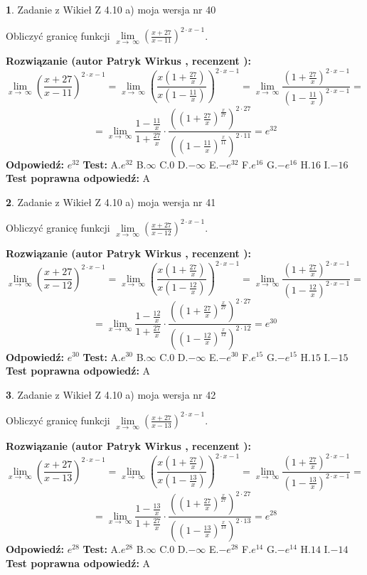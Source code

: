 \documentclass[12pt, a4paper]{article}
\theoremstyle{definition} %
\newtheorem{zad}{}
\newcommand{\zadStart}[1]{\begin{zad}#1\newline}
\newcommand{\zadStop}{\end{zad}}
\newcommand{\rozwStart}[2]{\noindent \textbf{Rozwiązanie (autor #1 , recenzent #2): }\newline}
\newcommand{\rozwStop}{\newline}
\newcommand{\odpStart}{\noindent \textbf{Odpowiedź:}\newline}
\newcommand{\odpStop}{\newline}
\newcommand{\testStart}{\noindent \textbf{Test:}\newline}
\newcommand{\testStop}{\newline}
\newcommand{\kluczStart}{\noindent \textbf{Test poprawna odpowiedź:}\newline}
\newcommand{\kluczStop}{\newline}
\begin{document}
\zadStart{Zadanie z Wikieł Z 4.10 a) moja wersja nr 40}

Obliczyć granicę funkcji  $\lim\limits_{x\to\ \infty}(\frac{x+27}{x-11})^{2\cdot x-1}$.
\zadStop
\rozwStart{Patryk Wirkus}{}
$$\lim\limits_{x\to\ \infty}(\frac{x+27}{x-11})^{2\cdot x-1} = \lim\limits_{x\to\ \infty}(\frac{x(1+\frac{27}{x})}{x(1-\frac{11}{x})})^{2\cdot x-1}=\lim\limits_{x\to\ \infty}\frac{(1+\frac{27}{x})^{2\cdot x-1}}{(1-\frac{11}{x})^{2\cdot x-1}}=$$
$$=\lim\limits_{x\to\ \infty}\frac{1-\frac{11}{x}}{1+\frac{27}{x}}\cdot\frac{((1+\frac{27}{x})^{\frac{x}{27}})^{2\cdot27}}{((1-\frac{11}{x})^{\frac{x}{11}})^{2\cdot11}}=e^{32}$$
\rozwStop
\odpStart
$e^{32}$
\odpStop
\testStart
A.$e^{32}$ B.$\infty$ C.$0$ D.$-\infty$ E.$-e^{32}$
F.$e^{16}$ G.$-e^{16}$
H.$16$
I.$-16$
\testStop
\kluczStart
A
\kluczStop



\zadStart{Zadanie z Wikieł Z 4.10 a) moja wersja nr 41}

Obliczyć granicę funkcji  $\lim\limits_{x\to\ \infty}(\frac{x+27}{x-12})^{2\cdot x-1}$.
\zadStop
\rozwStart{Patryk Wirkus}{}
$$\lim\limits_{x\to\ \infty}(\frac{x+27}{x-12})^{2\cdot x-1} = \lim\limits_{x\to\ \infty}(\frac{x(1+\frac{27}{x})}{x(1-\frac{12}{x})})^{2\cdot x-1}=\lim\limits_{x\to\ \infty}\frac{(1+\frac{27}{x})^{2\cdot x-1}}{(1-\frac{12}{x})^{2\cdot x-1}}=$$
$$=\lim\limits_{x\to\ \infty}\frac{1-\frac{12}{x}}{1+\frac{27}{x}}\cdot\frac{((1+\frac{27}{x})^{\frac{x}{27}})^{2\cdot27}}{((1-\frac{12}{x})^{\frac{x}{12}})^{2\cdot12}}=e^{30}$$
\rozwStop
\odpStart
$e^{30}$
\odpStop
\testStart
A.$e^{30}$ B.$\infty$ C.$0$ D.$-\infty$ E.$-e^{30}$
F.$e^{15}$ G.$-e^{15}$
H.$15$
I.$-15$
\testStop
\kluczStart
A
\kluczStop



\zadStart{Zadanie z Wikieł Z 4.10 a) moja wersja nr 42}

Obliczyć granicę funkcji  $\lim\limits_{x\to\ \infty}(\frac{x+27}{x-13})^{2\cdot x-1}$.
\zadStop
\rozwStart{Patryk Wirkus}{}
$$\lim\limits_{x\to\ \infty}(\frac{x+27}{x-13})^{2\cdot x-1} = \lim\limits_{x\to\ \infty}(\frac{x(1+\frac{27}{x})}{x(1-\frac{13}{x})})^{2\cdot x-1}=\lim\limits_{x\to\ \infty}\frac{(1+\frac{27}{x})^{2\cdot x-1}}{(1-\frac{13}{x})^{2\cdot x-1}}=$$
$$=\lim\limits_{x\to\ \infty}\frac{1-\frac{13}{x}}{1+\frac{27}{x}}\cdot\frac{((1+\frac{27}{x})^{\frac{x}{27}})^{2\cdot27}}{((1-\frac{13}{x})^{\frac{x}{13}})^{2\cdot13}}=e^{28}$$
\rozwStop
\odpStart
$e^{28}$
\odpStop
\testStart
A.$e^{28}$ B.$\infty$ C.$0$ D.$-\infty$ E.$-e^{28}$
F.$e^{14}$ G.$-e^{14}$
H.$14$
I.$-14$
\testStop
\kluczStart
A
\kluczStop
\end{document}
